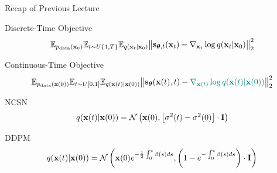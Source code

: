 \documentclass{beamer}
\begin{document}
\begin{frame}{Recap of Previous Lecture}
	\begin{block}{Discrete-Time Objective}
		\vspace{-0.3cm}
		\[
			\mathbb{E}_{p_{\text{data}}(\mathbf{x}_0)} \mathbb{E}_{t \sim U\{1, T\}} \mathbb{E}_{q(\mathbf{x}_t | \mathbf{x}_0)}\bigl\| \mathbf{s}_{\boldsymbol{\theta}, t}(\mathbf{x}_t) - \nabla_{\mathbf{x}_t} \log q(\mathbf{x}_t | \mathbf{x}_0) \bigr\|^2_2 
		\]
		\vspace{-0.5cm}
	\end{block}
	\begin{block}{Continuous-Time Objective}
		\vspace{-0.5cm}
		\[
			\mathbb{E}_{p_{\text{data}}(\mathbf{x}(0))} \mathbb{E}_{t \sim U[0, 1]} \mathbb{E}_{q(\mathbf{x}(t) | \mathbf{x}(0))}\bigl\| \mathbf{s}_{\boldsymbol{\theta}}(\mathbf{x}(t), t) - {\color{teal}\nabla_{\mathbf{x}(t)} \log q(\mathbf{x}(t) | \mathbf{x}(0))} \bigr\|^2_2 
		\]
		\vspace{-0.5cm}
	\end{block}
	\begin{block}{NCSN}
		\vspace{-0.3cm}
		\[
			q(\mathbf{x}(t) | \mathbf{x}(0)) = \mathcal{N}\left(\mathbf{x}(0), \left[\sigma^2(t) - \sigma^2(0)\right] \cdot \mathbf{I}\right)
		\]
		\vspace{-0.5cm}
	\end{block}
	\begin{block}{DDPM}
		\vspace{-0.3cm}
		\[
			q(\mathbf{x}(t) | \mathbf{x}(0)) = \mathcal{N}\left(\mathbf{x}(0) e^{-\frac{1}{2} \int_0^t\beta(s)ds}, \left(1 - e^{- \int_0^t\beta(s)ds}\right) \cdot \mathbf{I}\right)
		\]
		\vspace{-0.5cm}
	\end{block}
	
\end{frame}
\end{document}
